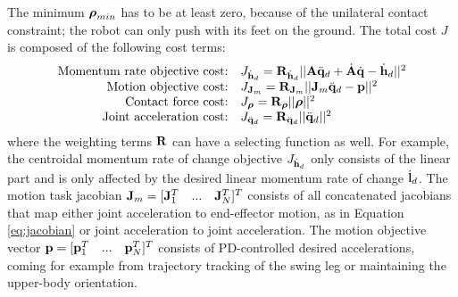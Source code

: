 The minimum $\boldsymbol{\rho}_{min}$ has to be at least zero, because of the unilateral contact constraint; the robot can only push with its feet on the ground. The total cost $J$ is composed of the following cost terms:
\begin{equation*}
\begin{array}{rlcl}
$Momentum rate objective cost:$ & J_{\dot{\vect{h}}_d}= \wght_{\dot{\vect{h}}_d}||\matr{A}\ddqjntd + \dot{\matr{A}}\dqjnt - \dot{\vect{h}}_d||^2\\
$Motion objective cost:$ & J_{\matr{J}_m} = \wght_{\matr{J}_m}||\matr{J}_m\ddqjntd-\vect{p}||^2\\
$Contact force cost:$ & J_{\bs{\rho}}=\wght_{\bs{\rho}}||\bs{\rho}||^2 \\
$Joint acceleration cost:$ & J_{\ddqjntd} = \wght_{\ddqjntd}||\ddqjntd ||^2 \\
\end{array}
\end{equation*}
where the weighting terms $\mathbf{R}$ can have a selecting function as well. For example, the centroidal momentum rate of change objective $J_{\dot{\mathbf{h}}_d}$ only consists of the linear part and is only affected by the desired linear momentum rate of change $\dot{\mathbf{l}}_d$. The motion task jacobian $\mathbf{J}_m = [\mathbf{J}_1^T\quad...\quad\mathbf{J}_N^T]^T$ consists of all concatenated jacobians that map either joint acceleration to end-effector motion, as in Equation \eqref{eq:jacobian} or joint acceleration to joint acceleration. The motion objective vector $\mathbf{p} = [\mathbf{p}_1^T\quad...\quad\mathbf{p}_N^T]^T$  consists of PD-controlled desired accelerations, coming for example from trajectory tracking of the swing leg or maintaining the upper-body orientation. %

